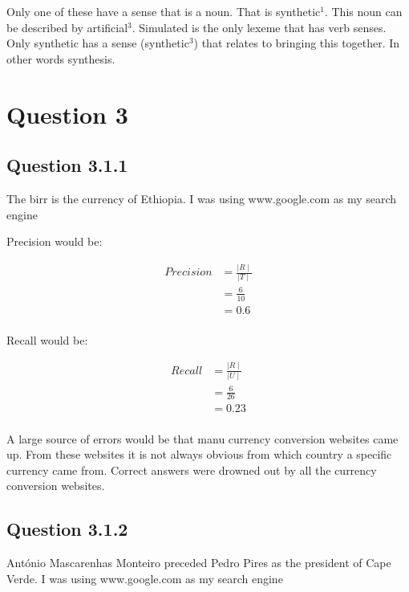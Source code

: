 \documentclass[10pt,a4paper]{article}
\begin{document}
Only one of these have a sense that is a noun. That is synthetic$^1$. This noun can be described by artificial$^3$.
Simulated is the only lexeme that has verb senses.
Only synthetic has a sense (synthetic$^3$) that relates to bringing this together. In other words synthesis.

\section{Question 3}

\subsection{Question 3.1.1}

The birr is the currency of Ethiopia. I was using www.google.com as my search engine

Precision would be:

\begin{equation}
\begin{split}
Precision &= \frac{\mid R \mid}{\mid T \mid} \\
&= \frac{6}{10}\\
&=0.6\\ 
\end{split}
\end{equation}

Recall would be:

\begin{equation}
\begin{split}
Recall &= \frac{\mid R \mid}{\mid U \mid} \\ 
&= \frac{6}{26} \\
&= 0.23 \\
\end{split}
\end{equation}

A large source of errors would be that manu currency conversion websites came up. From these websites it is not always obvious from which country a specific currency came from. Correct answers were drowned out by all the currency conversion websites.

\subsection{Question 3.1.2}

António Mascarenhas Monteiro preceded Pedro Pires as the president of Cape Verde. I was using www.google.com as my search engine
\end{document}
